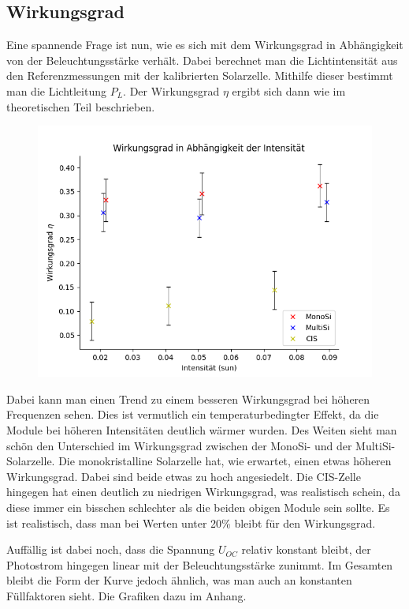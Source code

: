 \subsection{Wirkungsgrad}

Eine spannende Frage ist nun, wie es sich mit dem Wirkungsgrad in Abhängigkeit von der Beleuchtungsstärke verhält. 
Dabei berechnet man die Lichtintensität aus den Referenzmessungen mit der kalibrierten Solarzelle. Mithilfe dieser 
bestimmt man die Lichtleitung $P_L$. Der Wirkungsgrad $\eta$ ergibt sich dann wie im theoretischen Teil beschrieben. 

\begin{figure}[h]
    \centering
    \includegraphics[width = \linewidth]{Bilder/PlotWirkungsgradInt.png}
\end{figure}

Dabei kann man einen Trend zu einem besseren Wirkungsgrad bei höheren Frequenzen sehen. Dies ist vermutlich ein 
temperaturbedingter Effekt, da die Module bei höheren Intensitäten deutlich wärmer wurden. Des Weiten sieht man schön den Unterschied 
im Wirkungsgrad zwischen der MonoSi- und der MultiSi-Solarzelle. Die monokristalline Solarzelle hat, wie erwartet, einen etwas höheren 
Wirkungsgrad. Dabei sind beide etwas zu hoch angesiedelt. 
Die CIS-Zelle hingegen hat einen deutlich zu niedrigen Wirkungsgrad, was realistisch schein, da diese immer ein bisschen schlechter als die beiden obigen Module 
sein sollte. Es ist realistisch, dass man bei Werten unter 20\% bleibt für den Wirkungsgrad.\

Auffällig ist dabei noch, dass die Spannung $U_{OC}$ relativ konstant bleibt, der Photostrom hingegen linear mit der Beleuchtungsstärke zunimmt. 
Im Gesamten bleibt die Form der Kurve jedoch ähnlich, was man auch an konstanten Füllfaktoren sieht. Die Grafiken dazu im Anhang.


